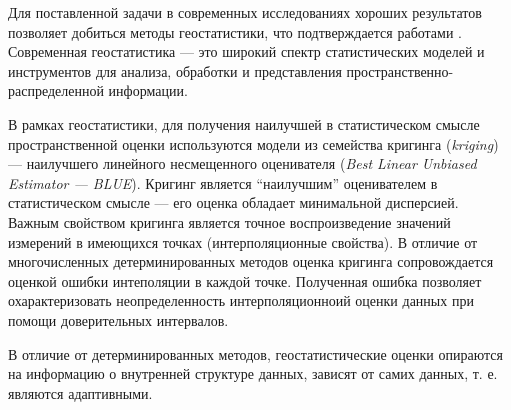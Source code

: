 Для поставленной задачи в современных исследованиях хороших результатов позволяет добиться методы геостатистики, что подтверждается работами \cite{GeoStCompar1987, GeoStCompar1998}. Современная геостатистика --- это широкий спектр статистических моделей и инструментов для анализа, обработки и представления пространственно-распределенной информации.

В рамках геостатистики, для получения наилучшей в статистическом смысле пространственной оценки используются модели из семейства кригинга (\textit{kriging}) --- наилучшего линейного несмещенного оценивателя (\textit{Best Linear Unbiased Estimator --- BLUE}). Кригинг является ``наилучшим'' оценивателем в статистическом смысле --- его оценка обладает минимальной дисперсией. Важным свойством кригинга является точное воспроизведение значений измерений в имеющихся точках (интерполяционные свойства). В отличие от многочисленных детерминированных методов оценка кригинга сопровождается оценкой ошибки интеполяции в каждой точке. Полученная ошибка позволяет охарактеризовать неопределенность интерполяционноий оценки данных при помощи доверительных интервалов.

В отличие от детерминированных методов, геостатистические оценки опираются на информацию о внутренней структуре данных, зависят от самих данных, т. е. являются адаптивными.

